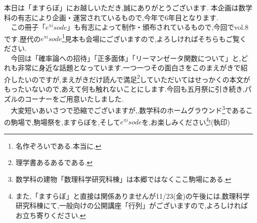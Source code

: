 
本日は「ますらぼ」にお越しいただき,誠にありがとうございます.
本企画は数学科の有志により企画・運営されているもので,今年で6年目となります.\\
　この冊子「$e^{\pi i}sode$」も有志によって制作・頒布されているもので,今回でvol.8です.歴代の$e^{\pi i}sode$\footnote{名作ぞろいである.本当に.}見本も会場にございますので,よろしければそちらもご覧ください.\\
　今回は「確率論への招待」「正多面体」「リーマンゼータ関数について」と,どれも非常に身近な話題となっています.一つ一つその面白さをこのまえがきで紹介したいのですが,まえがきだけ読んで満足\footnote{理学書あるあるである.}していただいてはせっかくの本文がもったいないので,あえて何も触れないことにします.今回も五月祭に引き続き,パズルのコーナーをご用意いたしました.\\
　大変短いあいさつで恐縮でございますが,,数学科のホームグラウンド\footnote{数学科の建物「数理科学研究科棟」は本郷ではなくここ駒場にある.}であるこの駒場で,駒場祭を,ますらぼを,そして$e^{\pi i}sode$を,お楽しみください\footnote{また,「ますらぼ」と直接は関係ありませんが11/23(金)の午後には,数理科学研究科棟にて,一般向けの公開講座「行列」がございますので,よろしければお立ち寄りください.}!(執印)
